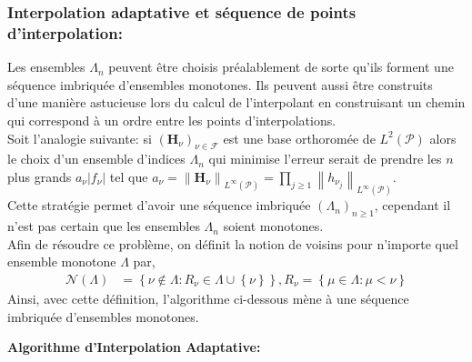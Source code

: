 \newpage
\subsubsection{Interpolation adaptative et séquence de points d'interpolation:}

\hspace{0.5cm}
Les ensembles $\Lambda_n$ peuvent être choisis préalablement de sorte qu'ils forment une
séquence imbriquée d'ensembles monotones. Ils peuvent aussi être construits d'une manière astucieuse
lors du calcul de l'interpolant en construisant un chemin qui correspond à un ordre entre les points d'interpolations. \\

Soit l'analogie suivante: si $(\textbf{H}_{\nu})_{\nu \in \mathcal{F}}$ est une base orthoromée de $L^2(\mathcal{P})$ alors
le choix d'un ensemble d'indices $\Lambda_n$ qui minimise l'erreur  serait de prendre les $n$ plus grands $a_{\nu} \left | f_{\nu}  \right |$
tel que $a_{\nu} = \left \| \textbf{H}_{\nu} \right \|_{L^{\infty}(\mathcal{P})} = \prod_{j \geq 1} \left \| {h_{\nu_j}} \right \|_{L^{\infty}(\mathcal{P})}$. \\
Cette stratégie permet d'avoir une séquence imbriquée $(\Lambda_n)_{n \geq 1}$, cependant il n'est pas certain que les
ensembles $\Lambda_n$ soient monotones. \\
Afin de résoudre ce problème, on définit la notion de voisins pour n'importe quel ensemble monotone $\Lambda$ par, \\
\begin{align}
	 \mathcal{N}(\Lambda) & = \left \{ \nu \notin \Lambda : R_{\nu} \in \Lambda \cup \left \{ \nu \right \} \right \}, R_{\nu} = \left \{ \mu \in \Lambda : \mu < \nu \right \}
\end{align}
Ainsi, avec cette définition, l'algorithme ci-dessous mène à une séquence imbriquée d'ensembles monotones. \\
\vspace{0.5cm}

\textbf{Algorithme d'Interpolation Adaptative:}

\vspace{0.5cm}

